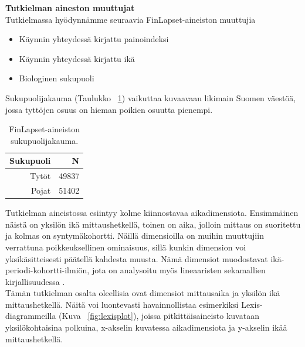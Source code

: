 \documentclass[finnish]{docopts}
\begin{document}
\textbf{Tutkielman aineston muuttujat}\\

Tutkielmassa hyödynnämme seuraavia FinLapset-aineiston muuttujia

\begin{itemize}
    \item Käynnin yhteydessä kirjattu painoindeksi
    \item Käynnin yhteydessä kirjattu ikä
    \item Biologinen sukupuoli
\end{itemize}

Sukupuolijakauma (Taulukko ~\ref{table:sukupuolijakauma}) vaikuttaa kuvaavaan likimain Suomen väestöä, jossa tyttöjen osuus on hieman poikien osuutta pienempi.\\

\begin{table}[H]
\centering
\begin{tabular}{rr}
\toprule
Sukupuoli & N\\
\midrule
Tytöt & 49837\\
Pojat & 51402\\
\bottomrule
\end{tabular}
\caption{FinLapset-aineiston sukupuolijakauma.}
\label{table:sukupuolijakauma}
\end{table}

Tutkielman aineistossa esiintyy kolme kiinnostavaa aikadimensiota. Ensimmäinen näistä on yksilön ikä mittaushetkellä, toinen on aika, jolloin mittaus on suoritettu ja kolmas on syntymäkohortti. Näillä dimensioilla on muihin muuttujiin verrattuna poikkeuksellinen ominaisuus, sillä kunkin dimension voi yksikäsitteisesti päätellä kahdesta muusta. Nämä dimensiot muodostavat ikä-periodi-kohortti-ilmiön, jota on analysoitu myös lineaaristen sekamallien kirjallisuudessa \cite{yang06}.\\

Tämän tutkielman osalta oleellisia ovat dimensiot mittausaika ja yksilön ikä mittaushetkellä. Näitä voi luontevasti havainnollistaa esimerkiksi Lexis-diagrammeilla (Kuva ~\ref{fig:lexisplot}), joissa pitkittäisaineisto kuvataan yksilökohtaisina polkuina, x-akselin kuvatessa aikadimensiota ja y-akselin ikää mittaushetkellä.\\
\end{document}
